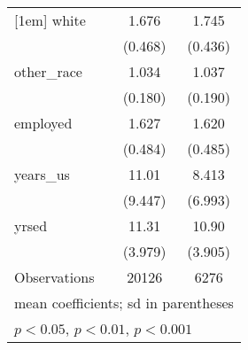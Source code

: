 \begin{table}[htbp]
\begin{tabular}{l*{2}{c}}
[1em]
white               &       1.676         &       1.745         \\
                    &     (0.468)         &     (0.436)         \\
[1em]
other\_race          &       1.034         &       1.037         \\
                    &     (0.180)         &     (0.190)         \\
[1em]
employed            &       1.627         &       1.620         \\
                    &     (0.484)         &     (0.485)         \\
[1em]
years\_us            &       11.01         &       8.413         \\
                    &     (9.447)         &     (6.993)         \\
[1em]
yrsed               &       11.31         &       10.90         \\
                    &     (3.979)         &     (3.905)         \\
\hline
Observations        &       20126         &        6276         \\
\hline\hline
\multicolumn{3}{l}{\footnotesize mean coefficients; sd in parentheses}\\
\multicolumn{3}{l}{\footnotesize \sym{*} \(p<0.05\), \sym{**} \(p<0.01\), \sym{***} \(p<0.001\)}\\
\end{tabular}
\end{table}
